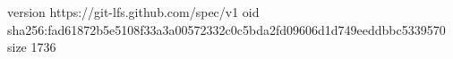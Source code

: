 version https://git-lfs.github.com/spec/v1
oid sha256:fad61872b5e5108f33a3a00572332c0c5bda2fd09606d1d749eeddbbc5339570
size 1736
